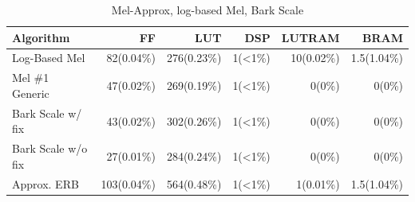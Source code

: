 \begin{table}[H]
    \centering
\begin{tabular}{ !{\color{ytblborder}\vrule}l!{\color{ytblborder}\vrule}rrrrr| } 
    \hline

    \hline
     \color{white}\bf{Algorithm} 
    & \color{white}\bf{FF} 
    & \color{white}\bf{LUT} 
    & \color{white}\bf{DSP} 
    & \color{white}\bf{LUTRAM} 
    & \color{white}\bf{BRAM} \\
    \hline

    \hline
     Log-Based Mel   & 82(0.04\%) & 276(0.23\%) & 1(<1\%) & 10(0.02\%) & 1.5(1.04\%) \\
    \hline
    
    \hline
     Mel \#1 Generic     & 47(0.02\%) & 269(0.19\%) & 1(<1\%) & 0(0\%)  & 0(0\%)    \\
    \hline
    
    \hline
     Bark Scale w/ fix     & 43(0.02\%) & 302(0.26\%) & 1(<1\%) & 0(0\%) & 0(0\%)  \\
    \hline

    \hline
     Bark Scale w/o fix     & 27(0.01\%) & 284(0.24\%) & 1(<1\%) & 0(0\%)  & 0(0\%)    \\
    \hline

    \hline
     Approx. ERB     & 103(0.04\%) & 564(0.48\%) & 1(<1\%) & 1(0.01\%)  & 1.5(1.04\%)    \\
    \hline

    \hline
\end{tabular}
\caption{Mel-Approx, log-based Mel, Bark Scale}
\label{tbl:IQRD_perf}
\end{table}



